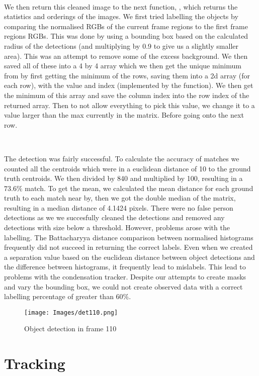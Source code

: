\documentclass{article}
\begin{document}
\

We then return this cleaned image to the next function, , which returns the statistics and orderings of the images. We first tried labelling the objects by comparing the normalised RGBs of the current frame regions to the first frame regions RGBs. This was done by using a bounding box based on the calculated radius of the detections (and multiplying by 0.9 to give us a slightly smaller area). This was an attempt to remove some of the excess background. We then saved all of these into a 4 by 4 array which we then get the unique minimum from by first getting the minimum of the rows, saving them into a 2d array (for each row), with the value and index (implemented by the  function). We then get the minimum of this array and save the column index into the row index of the returned array. Then to not allow everything to pick this value, we change it to a value larger than the max currently in the matrix. Before going onto the next row.


\

The detection was fairly successful. To calculate the accuracy of matches we counted all the centroids which were in a euclidean distance of 10 to the ground truth centroids. We then divided by 840 and multiplied by 100, resulting in a $73.6 \%$ match. To get the mean, we calculated the mean distance for each ground truth to each match near by, then we got the double median of the matrix, resulting in a median distance of 4.1424 pixels. There were no false person detections as we we succesfully cleaned the detections and removed any detections with size below a threshold. However, problems arose with the labelling. The Battacharyya distance comparison between normalised histograms frequently did not succeed in returning the correct labels. Even when we created a separation value based on the euclidean distance between object detections and the difference between histograms, it frequently lead to mislabels. This lead to problems with the condensation tracker. Despite our attempts to create masks and vary the bounding box, we could not create observed data with a correct labelling percentage of greater than $60 \%$. 


\begin{figure}[h]
    \centering
    \texttt{[image: Images/det110.png]} 
    \caption[b]{Object detection in frame 110}
\end{figure}



\section{Tracking}
\end{document}
